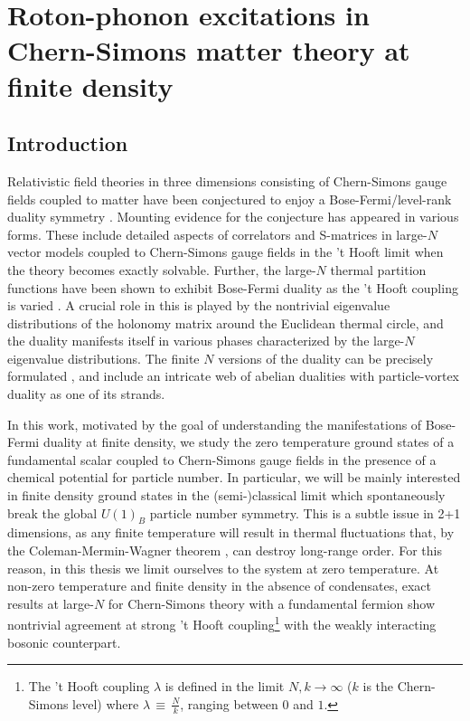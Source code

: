 \chapter{Roton-phonon excitations in Chern-Simons matter theory at finite density}
\label{ch:Chapter_3}
    \graphicspath{{Chapter_3_Folder/figures/PNG/}{Chapter_3_Folder/figures/PDF/}{Chapter_3_Folder/figures/}}

\section{Introduction}
Relativistic field theories in three dimensions consisting of Chern-Simons gauge fields coupled to matter have been conjectured to enjoy a Bose-Fermi/level-rank duality symmetry \cite{1110.4386}. Mounting evidence for the conjecture has appeared in various forms. These include detailed aspects of  correlators \cite{1110.4386, 1110.4382, Maldacena:2011jn, Maldacena:2012sf, Aharony:2012nh} and S-matrices \cite{Jain:2014nza, Dandekar:2014era} in large-$N$ vector models coupled to Chern-Simons gauge fields in the 't Hooft limit when the theory  becomes exactly solvable. 
Further, the large-$N$ thermal partition functions have been shown to exhibit Bose-Fermi duality as the 't Hooft coupling is varied \cite{1110.4386, 1211.4843,Jain:2013py, Jain:2013gza, Takimi:2013zca}.  A crucial role in this is played by the nontrivial eigenvalue distributions of the holonomy matrix around the Euclidean thermal circle, and the duality manifests itself in various phases characterized by the large-$N$ eigenvalue distributions. The  finite $N$ versions of the duality can be precisely formulated \cite{1512.00161}, and include an intricate web of abelian dualities \cite{Seiberg:2016gmd, 1606.01893, 1606.01912} with particle-vortex duality as one of its strands.

 In this work, motivated by the goal of understanding the manifestations of Bose-Fermi duality at finite density, we  study the zero temperature ground states of a fundamental scalar coupled to Chern-Simons gauge fields in the presence of a chemical potential for particle number. In particular, we will be mainly interested in finite density ground states in the (semi-)classical limit which spontaneously break the global $U(1)_B$ particle number symmetry. This is a subtle issue in 2+1 dimensions, as any finite temperature will result in thermal fluctuations that, by the Coleman-Mermin-Wagner theorem \cite{Coleman:1973ci, Mermin:1966fe}, can  destroy long-range order. 
 For this reason, in this thesis we limit ourselves to the system at zero temperature. 
 At  non-zero temperature and finite density in the absence of condensates,  exact results at large-$N$ for Chern-Simons theory with a fundamental fermion \cite{Geracie:2015drf, Gur-Ari:2016xff} show nontrivial agreement at strong 't Hooft coupling\footnote{The 't Hooft coupling $\lambda$ is defined in the limit $N,k\to\infty$  ($k$ is the Chern-Simons level) where $\lambda \,\equiv\,\frac{N}{k}$, ranging between $0$ and $1$. } with the weakly interacting bosonic counterpart.
 
